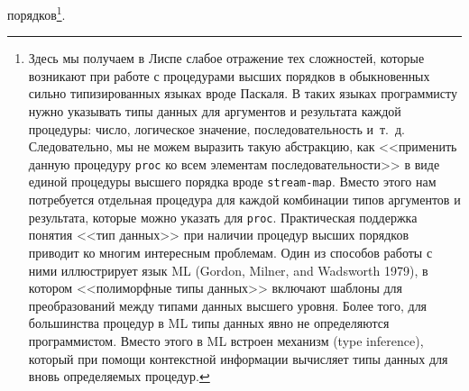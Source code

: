 порядков\footnote{Здесь мы получаем в Лиспе слабое отражение тех
сложностей, которые возникают при работе с процедурами высших порядков
 в
обыкновенных сильно типизированных языках
вроде Паскаля.  В таких
языках программисту нужно указывать типы данных для аргументов и
результата каждой процедуры: число, логическое значение,
последовательность и~т.~д.  Следовательно, мы не можем выразить такую
абстракцию, как <<применить данную процедуру {\tt proc} ко всем
элементам последовательности>> в виде единой процедуры высшего порядка
вроде {\tt stream-map}.  Вместо этого нам потребуется отдельная
процедура для каждой комбинации типов аргументов и результата, которые
можно указать для {\tt proc}.  Практическая поддержка понятия
<<тип данных>> при наличии процедур высших порядков приводит ко
многим интересным проблемам.  Один из способов работы с ними
иллюстрирует язык  ML (Gordon,
Milner, and Wadsworth 1979),
в котором <<полиморфные типы данных>> включают шаблоны для
преобразований между типами данных высшего уровня.  Более того, для
большинства процедур в ML типы данных явно не определяются
программистом.  Вместо этого в ML встроен механизм
 (type inference), который при помощи
контекстной информации вычисляет типы данных для вновь определяемых
процедур.}.

